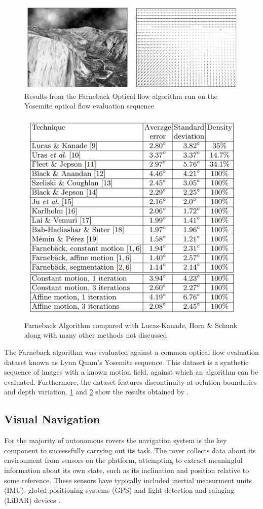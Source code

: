 \documentclass{UoNMCHA}
\numberwithin{equation}{section}
\begin{document}
\begin{figure}[ht]\label{fig:farnebackYosemite}
    \begin{center}
        \includegraphics[width=.6\linewidth]{Figures/farnebackYosemite}
        \caption{Results from the Farneback Optical flow algorithm run on the Yosemite optical flow evaluation sequence\citep{farneback2003two}}
    \end{center}
\end{figure}

\begin{figure}[ht]\label{fig:farnebackResults}
    \begin{center}
        \includegraphics[width=.5\linewidth]{Figures/farnebackResults}
        \caption{Farneback Algorithm compared with Lucas-Kanade, Horn \& Schunk along with many other methods not discussed \citep{farneback2003two}}
    \end{center}
\end{figure}

The Farneback algorithm was evaluated against a common optical flow evaluation dataset known as Lynn Quam’s Yosemite sequence. This dataset is a synthetic sequence of images with a known motion field, against which an algorithm can be evaluated. Furthermore, the dataset features discontinuity at oclution boundaries and depth variation. \cref{fig:farnebackYosemite} and \cref{fig:farnebackResults} show the results obtained by \cite{farneback2003two}.

\subsection{Visual Navigation}\label{sec:visualNavigation}
For the majority of autonomous rovers the navigation system is the key component to successfully carrying out its task. The rover collects data about its environment from sensors on the platform, attempting to extract meaningful information about its own state, such as its inclination and position relative to some reference. These sensors have typically included inertial measurment units (IMU), global positioning systems (GPS) and light detection and rainging (LiDAR) devices \citep{wang2015obstacle}.
\end{document}

